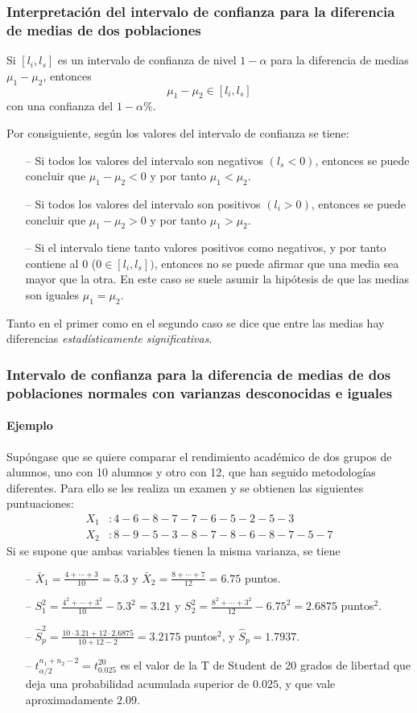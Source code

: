 \begin{frame}
\frametitle{Interpretación del intervalo de confianza para la diferencia de medias de dos poblaciones}
Si $[l_i,l_s]$ es un intervalo de confianza de nivel $1-\alpha$ para la diferencia de medias $\mu_1-\mu_2$, entonces
\[
\mu_1-\mu_2 \in [l_i,l_s]
\]
con una confianza del $1-\alpha\%$.

Por consiguiente, según los valores del intervalo de confianza se tiene:
\begin{itemize}
\item[--] Si todos los valores del intervalo son negativos $(l_s<0)$, entonces se puede concluir que $\mu_1-\mu_2<0$ y
por tanto $\mu_1<\mu_2$.
\item[--] Si todos los valores del intervalo son positivos $(l_i>0)$, entonces se puede concluir que $\mu_1-\mu_2>0$ y
por tanto $\mu_1>\mu_2$.
\item[--] Si el intervalo tiene tanto valores positivos como negativos, y por tanto contiene al 0 ($0\in [l_i,l_s])$,
entonces no se puede afirmar que una media sea mayor que la otra. En este caso se suele asumir la hipótesis de que las medias son iguales $\mu_1=\mu_2$.
\end{itemize}
Tanto en el primer como en el segundo caso se dice que entre las medias hay diferencias \emph{estadísticamente significativas}.
\end{frame}


\begin{frame}
\frametitle{Intervalo de confianza para la diferencia de medias de dos poblaciones normales con varianzas desconocidas
e iguales}
\framesubtitle{Ejemplo}
Supóngase que se quiere comparar el rendimiento académico de dos grupos de alumnos, uno con 10 alumnos y otro con 12, que han seguido metodologías diferentes.
Para ello se les realiza un examen y se obtienen las siguientes puntuaciones:
\begin{align*}
X_1 &: 4 - 6 - 8 - 7 - 7 - 6 - 5 - 2 - 5 - 3 \\
X_2 &: 8 - 9 - 5 - 3 - 8 - 7 - 8 - 6 - 8 - 7 - 5 - 7
\end{align*}
Si se supone que ambas variables tienen la misma varianza, se tiene
\begin{itemize}
\item[--] $\bar{X}_1 = \frac{4+\cdots +3}{10}=5.3$ y $\bar{X}_2=\frac{8+\cdots +7}{12}=6.75$ puntos.
\item[--] $S_1^2= \frac{4^2+\cdots + 3^2}{10}-5.3^2=3.21$ y $S_2^2= \frac{8^2+\cdots
+3^2}{12}-6.75^2=2.6875$ puntos$^2$.
\item[--] $\hat{S}_p^2 = \frac{10\cdot 3.21+12\cdot 2.6875}{10+12-2}= 3.2175$ puntos$^2$, y $\hat S_p=1.7937$.
\item[--] $t^{n_1+n_2-2}_{\alpha/2}=t^{20}_{0.025}$ es el valor de la T de Student de 20 grados de libertad que deja una probabilidad acumulada superior de $0.025$, y que vale aproximadamente $2.09$.
\end{itemize}
\end{frame}



